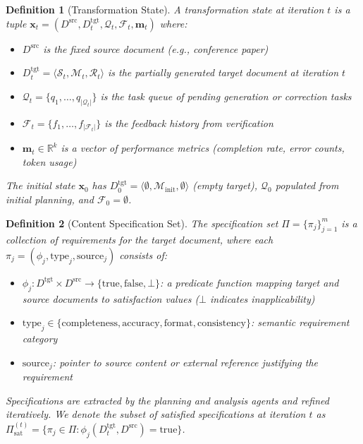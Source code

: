 \documentclass{ieeeaccess}
\newtheorem{definition}{Definition}
\begin{document}
\begin{definition}[Transformation State]
A transformation state at iteration \(t\) is a tuple \(\mathbf{x}_t = (D^{\text{src}}, D^{\text{tgt}}_{t}, \mathcal{Q}_t, \mathcal{F}_t, \mathbf{m}_t)\) where:
\begin{itemize}
\item \(D^{\text{src}}\) is the fixed source document (e.g., conference paper)
\item \(D^{\text{tgt}}_{t} = \langle \mathcal{S}_t, \mathcal{M}_t, \mathcal{R}_t \rangle\) is the partially generated target document at iteration \(t\)
\item \(\mathcal{Q}_t = \{q_1, \ldots, q_{|\mathcal{Q}_t|}\}\) is the task queue of pending generation or correction tasks
\item \(\mathcal{F}_t = \{f_1, \ldots, f_{|\mathcal{F}_t|}\}\) is the feedback history from verification
\item \(\mathbf{m}_t \in \mathbb{R}^k\) is a vector of performance metrics (completion rate, error counts, token usage)
\end{itemize}

The initial state \(\mathbf{x}_0\) has \(D^{\text{tgt}}_0 = \langle \emptyset, \mathcal{M}_{\text{init}}, \emptyset \rangle\) (empty target), \(\mathcal{Q}_0\) populated from initial planning, and \(\mathcal{F}_0 = \emptyset\).
\end{definition}

\begin{definition}[Content Specification Set]
The specification set \(\Pi = \{\pi_j\}_{j=1}^{m}\) is a collection of requirements for the target document, where each \(\pi_j = (\phi_j, \text{type}_j, \text{source}_j)\) consists of:
\begin{itemize}
\item \(\phi_j: D^{\text{tgt}} \times D^{\text{src}} \to \{\text{true}, \text{false}, \bot\}\): a predicate function mapping target and source documents to satisfaction values (\(\bot\) indicates inapplicability)
\item \(\text{type}_j \in \{\text{completeness}, \text{accuracy}, \text{format}, \text{consistency}\}\): semantic requirement category
\item \(\text{source}_j\): pointer to source content or external reference justifying the requirement
\end{itemize}

Specifications are extracted by the planning and analysis agents and refined iteratively. We denote the subset of satisfied specifications at iteration \(t\) as \(\Pi_{\text{sat}}^{(t)} = \{\pi_j \in \Pi : \phi_j(D^{\text{tgt}}_t, D^{\text{src}}) = \text{true}\}\).
\end{definition}
\end{document}
